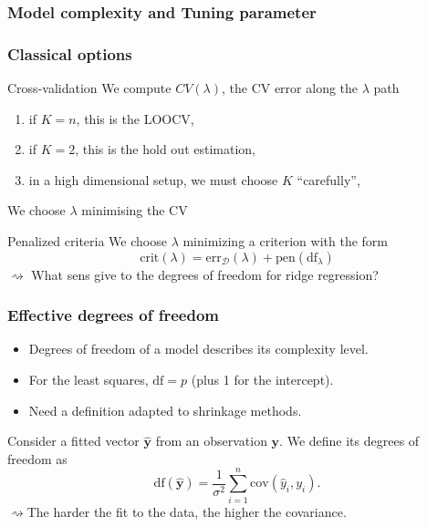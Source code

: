 \documentclass[10pt, c, xcolor=x11names]{beamer}\usepackage[]{graphicx}\usepackage[]{color}
\begin{document}
\subsubsection{Model complexity and Tuning parameter}

\begin{frame}
   \frametitle{Classical options}

 \begin{block}{Cross-validation}
   We compute $CV(\lambda)$, the CV error along the $\lambda$ path
    \begin{enumerate}
    \item if $K=n$, this is the LOOCV,
    \item if $K=2$, this is the hold out estimation,
    \item in a high dimensional setup, we must choose $K$ ``carefully'',
    \end{enumerate}
   We choose  $\lambda$ minimising the CV 
  \end{block}

\vfill

\begin{block}{Penalized criteria}
We choose  $\lambda$ minimizing a criterion with the form
\begin{equation*}
\mathrm{crit}(\lambda) = \mathrm{err}_\mathcal{D}(\lambda) + \mathrm{pen}(\mathrm{df}_\lambda)
\end{equation*}
$\rightsquigarrow$ What sens give to the degrees of freedom for ridge regression?
\end {block}

\end{frame}


\begin{frame}
  \frametitle{Effective degrees of freedom}

  \begin{itemize}
  \item Degrees of freedom of a model describes its complexity level.
  \item For the least squares, $\mathrm{df} = p$ (plus 1 for the intercept).
  \item Need a definition adapted to shrinkage methods.
  \end{itemize}

  \vfill

  \begin{definition}   Consider  a  fitted  vector
    $\hat{\mathbf{y}}$ from an observation $\mathbf{y}$. We define its
    degrees of freedom as
    \begin{equation*}
      \mathrm{df}(\hat{\mathbf{y}})    =    \frac{1}{\sigma^2}
      \sum_{i=1}^n \mathrm{cov}(\hat{y}_i,y_i).
    \end{equation*}
    $\rightsquigarrow$The  harder the fit  to the  data, the  higher the
    covariance.
  \end{definition}

\end{frame}
\end{document}
